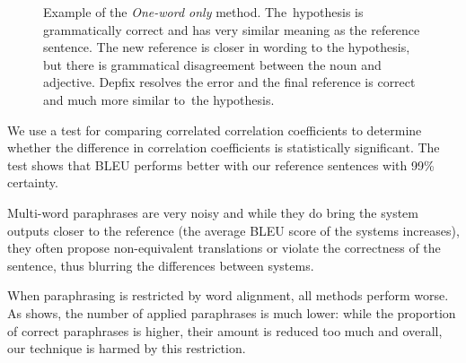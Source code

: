 \begin{figure}[t]
\begin{center}
\begin{tabular}{ll}
\end{tabular}
\caption{Example of the \textit{One-word only} method. 
The~hypothesis is grammatically correct and has very similar meaning as the 
reference sentence. The new reference is closer in wording to the hypothesis, 
but there is grammatical disagreement between the noun and adjective. Depfix 
resolves the error and the final reference is correct and much more similar 
to~the hypothesis.}
\label{example}
\end{center}
\end{figure}

We use a test for comparing correlated correlation coefficients 
\citep{meng1992comparing} to determine whether the difference in correlation
coefficients is statistically significant. The test shows that BLEU performs
better with our reference sentences with 99\% certainty. 

Multi-word paraphrases are very noisy and while they do bring the system 
outputs closer to the reference (the average BLEU score of the systems 
increases), they often propose non-equivalent translations or violate the 
correctness of the sentence, thus blurring the differences between systems.

When paraphrasing is restricted by word alignment, all methods perform worse. 
As  shows, the number of applied paraphrases is much
lower: while the proportion of correct paraphrases is higher, their amount is 
reduced too much and overall, our technique is harmed by this restriction. 

